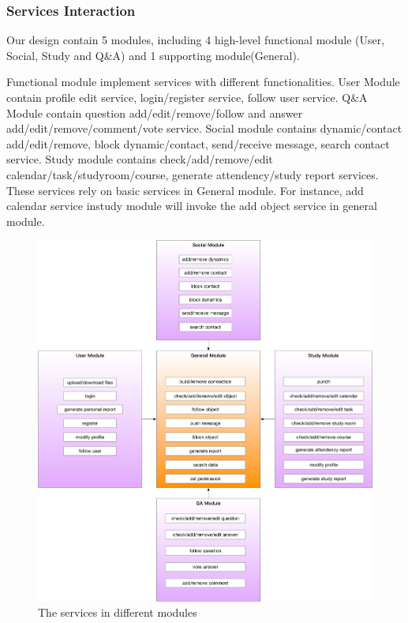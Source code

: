 \documentclass[runningheads]{llncs}
\begin{document}
\subsubsection{Services Interaction}
Our design contain 5 modules, including 4 high-level functional module (User, Social, Study and Q\&A) and 1 supporting module(General). 

Functional module implement services with different functionalities. User Module contain profile edit service, login/register service, follow user service. Q\&A Module contain question add/edit/remove/follow and answer add/edit/remove/comment/vote service. Social module contains dynamic/contact add/edit/remove, block dynamic/contact, send/receive message, search contact service. Study module contains check/add/remove/edit calendar/task/studyroom/course, generate attendency/study report services. These services rely on basic services in General module. For instance, add calendar service instudy module will invoke the add object service in general module.



\begin{figure}[H]
    \centering %
    \includegraphics[width=1.0\textwidth]{figure/MWZH/services} %
    \caption{The services in different modules} %
    \label{fig12}
\end{figure}
\end{document}
